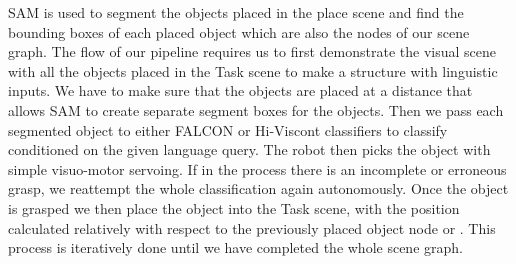 SAM is used to segment the objects placed in the place scene and find the bounding boxes of each placed object which are also the nodes of our scene graph.
The flow of our pipeline requires us to first demonstrate the visual scene with all the objects placed in the Task scene to make a structure with linguistic inputs. 
We have to make sure that the objects are placed at a distance that allows SAM to create separate segment boxes for the objects. Then we pass each segmented object to either FALCON or Hi-Viscont classifiers to classify conditioned on the given language query. The robot then picks the object with simple visuo-motor servoing. 
If in the process there is an incomplete or erroneous grasp, we reattempt the whole classification again autonomously. Once the object is grasped we then place the object into the Task scene, with the position calculated relatively with respect to the previously placed object node or . This process is iteratively done until we have completed the whole scene graph.


